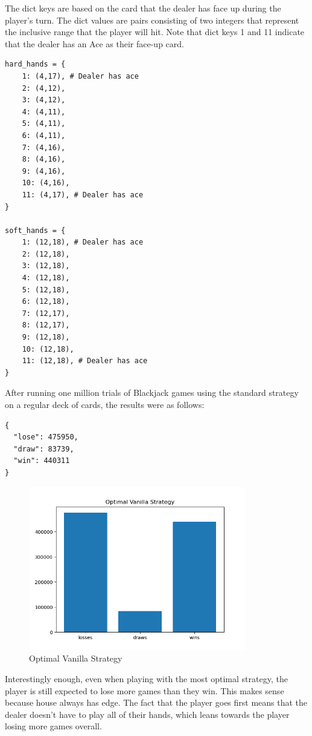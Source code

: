 \documentclass{article}
\begin{document}
{		The dict keys are based on the card that the dealer has face up during the player's turn.
		The dict values are pairs consisting of two integers that represent the inclusive range that the player will hit. 
		Note that dict keys 1 and 11 indicate that the dealer has an Ace as their face-up card.

    \begin{verbatim}
hard_hands = {
	1: (4,17), # Dealer has ace
	2: (4,12),
	3: (4,12),
	4: (4,11),
	5: (4,11),
	6: (4,11),
	7: (4,16),
	8: (4,16),
	9: (4,16),
	10: (4,16),
	11: (4,17), # Dealer has ace
}

soft_hands = {
	1: (12,18), # Dealer has ace
	2: (12,18), 
	3: (12,18), 
	4: (12,18), 
	5: (12,18), 
	6: (12,18), 
	7: (12,17), 
	8: (12,17), 
	9: (12,18), 
	10: (12,18), 
	11: (12,18), # Dealer has ace
}
        \end{verbatim}

        After running one million trials of Blackjack games using the standard strategy on a regular deck of cards, the results 
		were as follows:

		\begin{verbatim}
{
  "lose": 475950,
  "draw": 83739,
  "win": 440311
}
        \end{verbatim}
        
		\begin{figure}[H]
			\hypertarget{fig2}{}
			\begin{center}
				\includegraphics[width=9.5cm]{optimal-vanilla.png}
			\end{center}
			\vspace{-10mm}
			\caption{Optimal Vanilla Strategy}
		\end{figure}

		Interestingly enough, even when playing with the most optimal strategy, the player is still expected to lose more games than they win.
		This makes sense because house always has edge. The fact that the player goes first means that the dealer doesn't have to
		play all of their hands, which leans towards the player losing more games overall.

}
\end{document}

